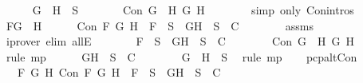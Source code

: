 \begin{isabellebody}
\ \ \ \ \isamarkupfalse%
\ {\isachardoublequoteopen}G\ \isactrlbold {\isasymand}\ H\ {\isasymin}\ S{\isachardoublequoteclose}\isanewline
\ \ \ \ \isamarkupfalse%
\ \isamarkupfalse%
\ {\isachardoublequoteopen}Con\ {\isacharparenleft}G\ \isactrlbold {\isasymand}\ H{\isacharparenright}\ G\ H{\isachardoublequoteclose}\isanewline
\ \ \ \ \ \ \isamarkupfalse%
\ {\isacharparenleft}simp\ only{\isacharcolon}\ Con{\isachardot}intros{\isacharparenleft}{}{\isacharparenright}{\isacharparenright}\isanewline
\ \ \ \ \isamarkupfalse%
\ {\isacharquery}F{\isacharequal}{\isachardoublequoteopen}G\ \isactrlbold {\isasymand}\ H{\isachardoublequoteclose}\isanewline
\ \ \ \ \isamarkupfalse%
\ {\isachardoublequoteopen}Con\ {\isacharquery}F\ G\ H\ {\isasymlongrightarrow}\ {\isacharquery}F\ {\isasymin}\ S\ {\isasymlongrightarrow}\ {\isacharbraceleft}G{\isacharcomma}H{\isacharbraceright}\ {\isasymunion}\ S\ {\isasymin}\ C{\isachardoublequoteclose}\isanewline
\ \ \ \ \ \ \isamarkupfalse%
\ assms\ \isamarkupfalse%
\ {\isacharparenleft}iprover\ elim{\isacharcolon}\ allE{\isacharparenright}\isanewline
\ \ \ \ \isamarkupfalse%
\ \isamarkupfalse%
\ {\isachardoublequoteopen}{\isacharquery}F\ {\isasymin}\ S\ {\isasymlongrightarrow}\ {\isacharbraceleft}G{\isacharcomma}H{\isacharbraceright}\ {\isasymunion}\ S\ {\isasymin}\ C{\isachardoublequoteclose}\isanewline
\ \ \ \ \ \ \isamarkupfalse%
\ {\isacartoucheopen}Con\ {\isacharparenleft}G\ \isactrlbold {\isasymand}\ H{\isacharparenright}\ G\ H{\isacartoucheclose}\ \isamarkupfalse%
\ {\isacharparenleft}rule\ mp{\isacharparenright}\isanewline
\ \ \ \ \isamarkupfalse%
\ {\isachardoublequoteopen}{\isacharbraceleft}G{\isacharcomma}H{\isacharbraceright}\ {\isasymunion}\ S\ {\isasymin}\ C{\isachardoublequoteclose}\isanewline
\ \ \ \ \ \ \isamarkupfalse%
\ {\isacartoucheopen}{\isacharparenleft}G\ \isactrlbold {\isasymand}\ H{\isacharparenright}\ {\isasymin}\ S{\isacartoucheclose}\ \isamarkupfalse%
\ {\isacharparenleft}rule\ mp{\isacharparenright}\isanewline
\ \ \isamarkupfalse%
\isanewline
{}\isamarkupfalse%
%
\endisatagproof
{\isafoldproof}%
%
\isadelimproof
\isanewline
%
\endisadelimproof
\isanewline
{}\isamarkupfalse%
\ pcp{\isacharunderscore}alt{}Con{}{\isacharcolon}\isanewline
\ \ \ {\isachardoublequoteopen}{\isasymforall}F\ G\ H{\isachardot}\ Con\ F\ G\ H\ {\isasymlongrightarrow}\ F\ {\isasymin}\ S\ {\isasymlongrightarrow}\ {\isacharbraceleft}G{\isacharcomma}H{\isacharbraceright}\ {\isasymunion}\ S\ {\isasymin}\ C{\isachardoublequoteclose}\isanewline

\end{isabellebody}
